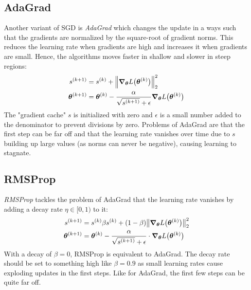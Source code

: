 		\subsection{AdaGrad}
			Another variant of SGD is \emph{AdaGrad} which changes the update in a ways such that the gradients are normalized by the square-root of gradient norms. This reduces the learning rate when gradients are high and increases it when gradients are small. Hence, the algorithms moves faster in shallow and slower in steep regions:
			\begin{align}
				s^{(k + 1)} &= s^{(k)} + \Big\lVert \grad_{\bm{\theta}} L\bigl(\bm{\theta}^{(k)}\bigr) \Big\rVert_2^2 \\
				\bm{\theta}^{(k + 1)} &= \bm{\theta}^{(k)} - \frac{\alpha}{\sqrt{s^{(k + 1)}} + \epsilon} \grad_{\bm{\theta}} L\bigl(\bm{\theta}^{(k)}\bigr)
			\end{align}
			The "gradient cache" \(s\) is initialized with zero and \(\epsilon\) is a small number added to the denominator to prevent divisions by zero. Problems of AdaGrad are that the first step can be far off and that the learning rate vanishes over time due to \(s\) building up large values (as norms can never be negative), causing learning to stagnate.

		\subsection{RMSProp}
			\emph{RMSProp} tackles the problem of AdaGrad that the learning rate vanishes by adding a decay rate \(\eta \in [0, 1)\) to it:
			\begin{align}
				s^{(k + 1)} &= s^{(k)} \beta s^{(k)} + (1 - \beta) \big\lVert \grad_{\bm{\theta}} L\bigl(\bm{\theta}^{(k)}\bigr) \big\rVert_2^2 \\
				\bm{\theta}^{(k + 1)} &= \bm{\theta}^{(k)} - \frac{\alpha}{\sqrt{s^{(k + 1)}} + \epsilon} \cdot \grad_{\bm{\theta}} L\bigl(\bm{\theta}^{(k)}\bigr)
			\end{align}
			With a decay of \( \beta = 0 \), RMSProp is equivalent to AdaGrad. The decay rate should be set to something high like \( \beta = 0.9 \) as small learning rates cause exploding updates in the first steps. Like for AdaGrad, the first few steps can be quite far off.

